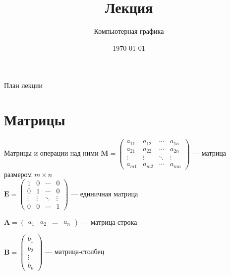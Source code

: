 \documentclass[10pt]{beamer}
\date{\today}
\title{Лекция \lecdni \\ \LectionTheme}
\subtitle{Компьютерная графика}
\begin{document}
 		 

    
    \QRFRAME
	
	
	\frame{\maketitle}
	
	
	
	\begin{frame}{План лекции}
		\tableofcontents
	\end{frame}
	
	\section{Матрицы}
	\frame{\sectionpage}
	
	\begin{frame}{Матрицы и операции над ними}
		$\mathbf M =
		\begin{pmatrix} a_{11} & a_{12} & \cdots & a_{1n}
			\\a_{21} & a_{22} & \cdots & a_{2n}
			\\ \vdots & \vdots & \ddots & \vdots
			\\ a_{m1} & a_{m2} & \cdots & a_{mn}
		\end{pmatrix} 
		$ --- матрица размером $m \times n$ \\
		$\mathbf E = \begin{pmatrix} 1 & 0 & \cdots & 0 \\ 0 & 1 & \cdots & 0 \\ \vdots & \vdots & \ddots & \vdots \\ 0 & 0 & \cdots & 1 \end{pmatrix}$ --- единичная матрица
		
		$\mathbf A = \begin{pmatrix}
			a_1 & a_2 & \ldots & a_n
		\end{pmatrix}$ --- матрица-строка
		
		$\mathbf B = \begin{pmatrix}
			b_1 \\ b_2 \\ \vdots \\ b_n
		\end{pmatrix}$ --- матрица-столбец	
		
	\end{frame}
	
\end{document}
